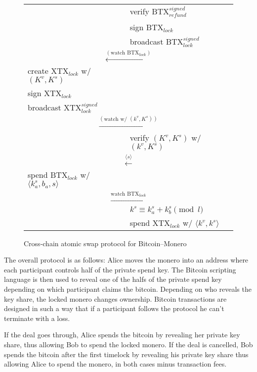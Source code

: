 \documentclass{llncs}
\begin{document}
\begin{figure}[H]
\begin{table}[H]
{\begin{tabular}{ | l l l | }
          & & verify $\text{BTX}_\textit{refund}^\textit{signed}$ \\
          & & sign $\text{BTX}_\textit{lock}$ \\
          & & broadcast $\text{BTX}_\textit{lock}^\textit{signed}$ \\
          \multicolumn{3}{|c|}{$\xleftarrow{(\text{watch BTX}_\textit{lock})}$} \\
          create $\text{XTX}_\textit{lock}$ w/ $(K^v, K^s)$ & & \\
          sign $\text{XTX}_\textit{lock}$ & & \\
          broadcast $\text{XTX}_\textit{lock}^\textit{signed}$ & & \\
          \multicolumn{3}{|c|}{$\xrightarrow{(\text{watch w/ } (k^v, K^s))}$} \\
          & & verify $(K^v, K^s)$ w/ $(k^v, K^s)$ \\
          \multicolumn{3}{|c|}{$\xleftarrow{\langle s \rangle}$} \\
          spend $\text{BTX}_\textit{lock}$ w/ $\langle k^s_a, b_a, s \rangle$ & & \\
          \multicolumn{3}{|c|}{$\xrightarrow{\text{watch BTX}_\textit{lock}}$} \\
          & & $k^s \equiv k^s_a + k^s_b \pmod l$ \\
          & & spend $\text{XTX}_\textit{lock}$ w/ $\langle k^v, k^s \rangle$ \\
        \hline
      \end{tabular}}
    \end{table}
  \caption{Cross-chain atomic swap protocol for Bitcoin--Monero}
  \label{fig:protocol}
\end{figure}

The overall protocol is as follows: Alice moves the monero into an address where each participant controls half of the private spend key. The Bitcoin scripting language is then used to reveal one of the halfs of the private spend key depending on which participant claims the bitcoin. Depending on who reveals the key share, the locked monero changes ownership. Bitcoin transactions are designed in such a way that if a participant follows the protocol he can't terminate with a loss.

If the deal goes through, Alice spends the bitcoin by revealing her private key share, thus allowing Bob to spend the locked monero. If the deal is cancelled, Bob spends the bitcoin after the first timelock by revealing his private key share thus allowing Alice to spend the monero, in both cases minus transaction fees.
\end{document}
